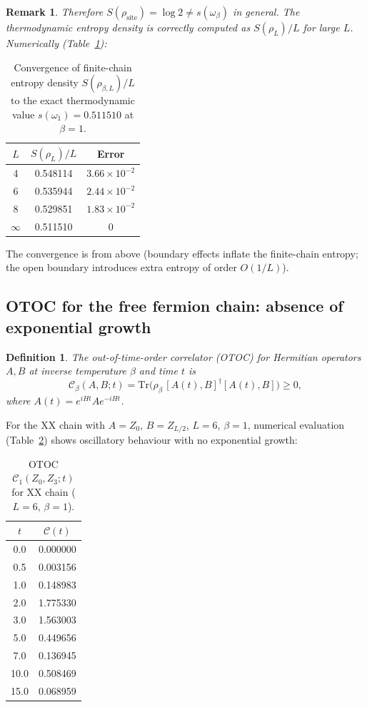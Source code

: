\documentclass[12pt,a4paper]{article}
\newtheorem{definition}[theorem]{Definition}
\newtheorem{remark}[theorem]{Remark}
\begin{document}
\begin{remark}
  Therefore $S(\rho_{\mathrm{site}}) = \log 2 \neq s(\omega_\beta)$ in general.
  The thermodynamic entropy density is correctly computed as $S(\rho_L)/L$ for large
  $L$.  Numerically (Table~\ref{tab:ff_conv}):
\end{remark}

\begin{table}[h]
\centering
\caption{Convergence of finite-chain entropy density $S(\rho_{\beta,L})/L$ to the
exact thermodynamic value $s(\omega_1) = 0.511510$ at $\beta = 1$.}
\label{tab:ff_conv}
\begin{tabular}{ccc}
\hline
$L$ & $S(\rho_L)/L$ & Error \\
\hline
4 & 0.548114 & $3.66 \times 10^{-2}$ \\
6 & 0.535944 & $2.44 \times 10^{-2}$ \\
8 & 0.529851 & $1.83 \times 10^{-2}$ \\
$\infty$ & 0.511510 & 0 \\
\hline
\end{tabular}
\end{table}

The convergence is from above (boundary effects inflate the finite-chain entropy; the
open boundary introduces extra entropy of order $O(1/L)$).

\subsection{OTOC for the free fermion chain: absence of exponential growth}

\begin{definition}
  The \emph{out-of-time-order correlator} (OTOC) for Hermitian operators $A, B$ at
  inverse temperature $\beta$ and time $t$ is
  \[
    \mathcal{C}_\beta(A, B; t) = \mathrm{Tr}\!\bigl(\rho_\beta\,
      [A(t), B]^\dagger [A(t), B]\bigr) \geq 0,
  \]
  where $A(t) = e^{iHt} A e^{-iHt}$.
\end{definition}

For the XX chain with $A = Z_0$, $B = Z_{L/2}$, $L = 6$, $\beta = 1$, numerical
evaluation (Table~\ref{tab:otoc_xx}) shows oscillatory behaviour with no
exponential growth:

\begin{table}[h]
\centering
\caption{OTOC $\mathcal{C}_1(Z_0, Z_3; t)$ for XX chain ($L = 6$, $\beta = 1$).}
\label{tab:otoc_xx}
\begin{tabular}{cc}
\hline
$t$ & $\mathcal{C}(t)$ \\
\hline
0.0  & 0.000000 \\
0.5  & 0.003156 \\
1.0  & 0.148983 \\
2.0  & 1.775330 \\
3.0  & 1.563003 \\
5.0  & 0.449656 \\
7.0  & 0.136945 \\
10.0 & 0.508469 \\
15.0 & 0.068959 \\
\hline
\end{tabular}
\end{table}
\end{document}
